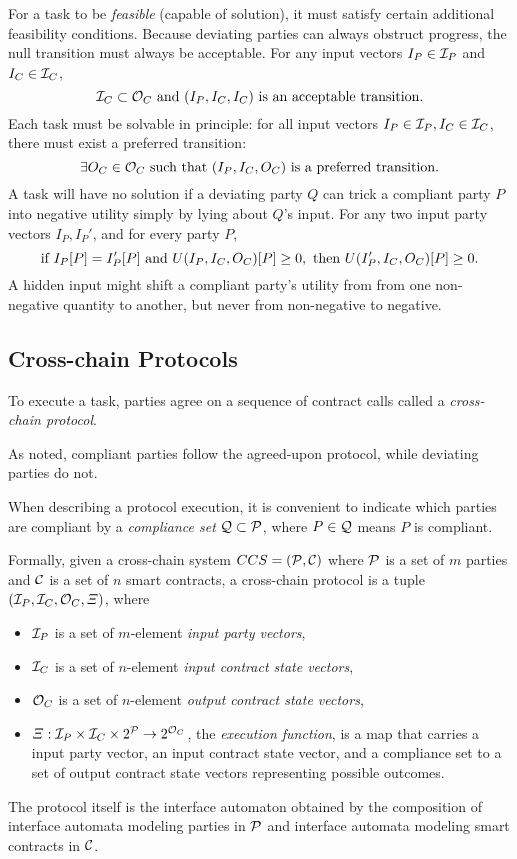 For a task to be \emph{feasible} (capable of solution),
it must satisfy certain additional feasibility conditions.
Because deviating parties can always obstruct progress,
the null transition must always be acceptable.
For any input vectors
$I_P \in {\mathcal I}_P$ and $I_C \in {\mathcal I}_C$,
\begin{equation}
  \eqnlabel{feas:nothing}
  \cI_C \subset \cO_C \text{ and } (I_P,I_C,I_C) \text{ is an acceptable transition}.
\end{equation}
Each task must be solvable in principle:
for all input vectors $I_P \in {\mathcal I}_P, I_C \in {\mathcal I}_C$,
there must exist a preferred transition:
\begin{equation}
  \eqnlabel{feas:prefer}
  \exists O_C \in \cO_C \text{ such that } (I_P,I_C,O_C) \text{ is a preferred transition}.
\end{equation}
A task will have no solution if a deviating party $Q$ can trick a compliant
party $P$ into negative utility simply by lying about $Q$'s input.
For any two input party vectors $I_P, I_P'$, and for every party $P$,
\begin{equation}
  \eqnlabel{feas:inputs}
  \text{if } I_P[P] = I_P'[P] \text{ and } U(I_P,I_C,O_C)[P] \geq 0,
  \text{ then } U(I_P',I_C,O_C)[P] \geq 0.
\end{equation}
A hidden input might shift a compliant party's utility from from one non-negative quantity to another,
but never from non-negative to negative.

\subsection{Cross-chain Protocols}
To execute a task,
parties agree on a sequence of contract calls called a \emph{cross-chain protocol}.

As noted,
compliant parties follow the agreed-upon protocol,
while deviating parties do not.

When describing a protocol execution,
it is convenient to indicate which parties are compliant by a
\emph{compliance set} ${\mathcal Q} \subset {\mathcal P}$,
where $P \in {\mathcal Q}$ means $P$ is compliant.

Formally, given a cross-chain system $CCS=({\mathcal P},{\mathcal C})$ where ${\mathcal P}$ is a set of $m$ parties and ${\mathcal C}$ is a set of $n$ smart contracts, a cross-chain 
protocol is a tuple $({\mathcal I}_P,{\mathcal I}_C,{\mathcal O}_C,\Xi)$,
where
\begin{itemize}
\item 
  ${\mathcal I}_P$ is a set of $m$-element \emph{input party vectors},
\item
  ${\mathcal I}_C$ is a set of $n$-element \emph{input contract state vectors},
\item
  ${\mathcal O}_C$ is a set of $n$-element \emph{output contract state vectors},
\item
  $\Xi: {\mathcal I}_P \times {\mathcal I}_C \times 2^{{\mathcal P}} \to 2^{{\mathcal O}_C}$,
  the \emph{execution function}, is a map
  that carries a input party vector, an input contract state vector,
  and a compliance set
  to a set of output contract state vectors representing possible outcomes.
\end{itemize}
The protocol itself is the interface automaton obtained by the composition of interface automata modeling parties in ${\mathcal P}$ and interface automata modeling smart contracts in ${\mathcal C}$.


